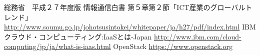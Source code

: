 \documentclass[mingoth]{kut-paper}		%
\begin{document}

\begin{acknowledgement}
%
\end{acknowledgement}


\begin{thebibliography}{99}
%
総務省　平成２７年度版 情報通信白書 第５章第２節「ICT産業のグローバルトレンド」 				\url{http://www.soumu.go.jp/johotsusintokei/whitepaper/ja/h27/pdf/index.html}
IBMクラウド・コンピューティング:IaaSとは-Japan
\url{http://www.ibm.com/cloud-computing/jp/ja/what-is-iaas.html}
OpenStack
\url{https://www.openstack.org}
\end{thebibliography}



%

%
\end{document}
